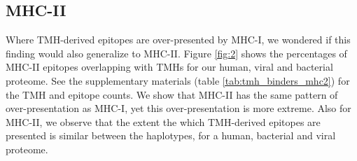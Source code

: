 \subsection{MHC-II}

Where TMH-derived epitopes are over-presented by MHC-I,
we wondered if this finding would also generalize to MHC-II.
Figure \ref{fig:2} shows the percentages of MHC-II epitopes overlapping 
with TMHs for our human, viral and bacterial proteome.
See the supplementary materials (table \ref{tab:tmh_binders_mhc2}) 
for the TMH and epitope counts.
We show that MHC-II has the same pattern of over-presentation
as MHC-I, yet this over-presentation is more extreme.
Also for MHC-II, we observe that the extent the which TMH-derived
epitopes are presented is similar between the haplotypes, for
a human, bacterial and viral proteome.

